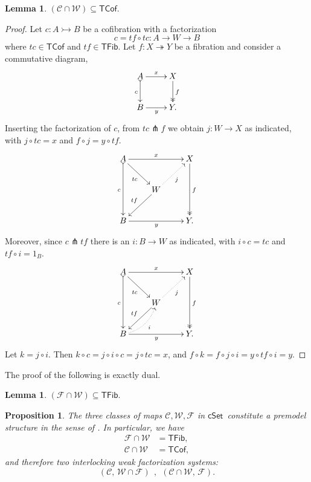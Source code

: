 \documentclass[11pt]{amsart}
\newcommand{\cSet}{\ensuremath{\mathsf{cSet}}}
\newcommand{\mono}{\ensuremath{\rightarrowtail}}
\newcommand{\ra}{\ensuremath{\rightarrow}}
\newcommand{\onto}{\ensuremath{\twoheadrightarrow}}
\newtheorem{proposition}[theorem]{Proposition}
\newtheorem{lemma}[theorem]{Lemma}
\theoremstyle{remark}
\theoremstyle{definition}
\begin{document}
\begin{lemma}
$(\mathcal{C} \cap \mathcal{W})  \subseteq \mathsf{TCof}.$
\end{lemma}
\begin{proof}
Let $c : A\mono B$ be a cofibration with a factorization $$c = tf\circ tc : A \ra W\ra B$$ where $tc\in\mathsf{TCof}$ and $tf\in\mathsf{TFib}$.  Let $f:X\onto Y$ be a fibration and consider a commutative diagram,
\begin{equation*}%
\xymatrix{
A \ar@{>->}[d]_{c} \ar[r]^-{x}  & X \ar@{>>}[d]^{f} \\
B \ar[r]_{y} &  Y.
}
\end{equation*}
Inserting the factorization of $c$, from $tc \pitchfork f$ we obtain $j : W\ra X$ as indicated, with $j\circ tc = x$ and $f\circ j = y\circ tf$.
\begin{equation*}%
\xymatrix{
A \ar@{>->}[dd]_{c} \ar[rd]_{tc} \ar[rr]^-{x}  && X \ar@{>>}[dd]^{f} \\
& W \ar[ld]_{tf} \ar@{.>}[ru]_{j} & \\
B \ar[rr]_{y} &&  Y.
}
\end{equation*}
Moreover, since $c\pitchfork tf$ there is an $i : B \ra W$ as indicated, with $i\circ c = tc$ and $tf\circ i = 1_B$.
\begin{equation*}%
\xymatrix{
A \ar@{>->}[dd]_{c} \ar[rd]_{tc} \ar[rr]^-{x}  && X \ar@{>>}[dd]^{f} \\
& W \ar[ld]_{tf} \ar@{.>}[ru]_{j} & \\
B \ar[rr]_{y} \ar@{.>}@/_2ex/[ru]_--{i} &&  Y.
}
\end{equation*}
Let $k = j\circ i$. Then $k \circ c = j\circ i \circ c = j \circ tc = x$, and $f \circ k = f\circ j\circ i = y\circ tf\circ i = y$.
\end{proof}

The proof of the following is exactly dual.
\begin{lemma}
$(\mathcal{F} \cap \mathcal{W})  \subseteq \mathsf{TFib}.$
\end{lemma}

\begin{proposition}\label{prop:FWC}
The three classes of maps $\mathcal{C}, \mathcal{W}, \mathcal{F}$ in \cSet\ constitute a \emph{premodel structure} in the sense of \cite{Barton}.   In particular,  we have 
\begin{align*}
\mathcal{F}\cap\mathcal{W} &= \mathsf{TFib}, \\
\mathcal{C}\cap\mathcal{W} &= \mathsf{TCof},
\end{align*}
and therefore two interlocking weak factorization systems:
\[
(\mathcal{C},\, \mathcal{W}\cap\mathcal{F})\ \ ,\ \ (\mathcal{C}\cap\mathcal{W},\, \mathcal{F}).
\]
\end{proposition}
\end{document}
